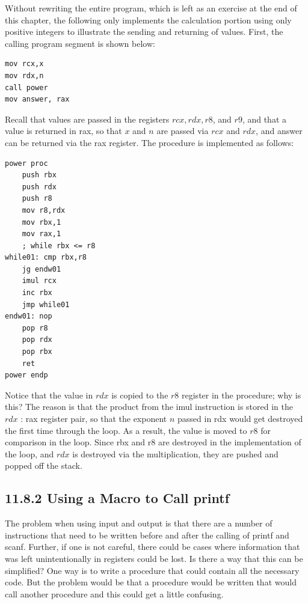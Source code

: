 \documentclass[10pt]{book}
\begin{document}
\begin{center}
\begin{center}
\begin{center}
\begin{center}
Without rewriting the entire program, which is left as an exercise at the end of this chapter, the following only implements the calculation portion using only positive integers to illustrate the sending and returning of values. First, the calling program segment is shown below:

\begin{verbatim}
mov rcx,x
mov rdx,n
call power
mov answer, rax
\end{verbatim}

Recall that values are passed in the registers $r c x, r d x, r 8$, and $r 9$, and that a value is returned in rax, so that $x$ and $n$ are passed via $r c x$ and $r d x$, and answer can be returned via the rax register. The procedure is implemented as follows:

\begin{verbatim}
power proc
    push rbx
    push rdx
    push r8
    mov r8,rdx
    mov rbx,1
    mov rax,1
    ; while rbx <= r8
while01: cmp rbx,r8
    jg endw01
    imul rcx
    inc rbx
    jmp while01
endw01: nop
    pop r8
    pop rdx
    pop rbx
    ret
power endp
\end{verbatim}

Notice that the value in $r d x$ is copied to the $r 8$ register in the procedure; why is this? The reason is that the product from the imul instruction is stored in the $r d x$ : rax register pair, so that the exponent $n$ passed in rdx would get destroyed the first time through the loop. As a result, the value is moved to $r 8$ for comparison in the loop. Since rbx and r8 are destroyed in the implementation of the loop, and $r d x$ is destroyed via the multiplication, they are pushed and popped off the stack.

\subsection*{11.8.2 Using a Macro to Call printf}
The problem when using input and output is that there are a number of instructions that need to be written before and after the calling of printf and scanf. Further, if one is not careful, there could be cases where information that was left unintentionally in registers could be lost. Is there a way that this can be simplified? One way is to write a procedure that could contain all the necessary code. But the problem would be that a procedure would be written that would call another procedure and this could get a little confusing.


\end{center}
\end{center}
\end{center}
\end{center}
\end{document}

